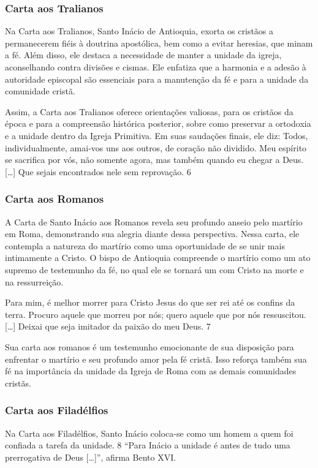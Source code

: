 \documentclass[a4paper,14pt]{extarticle} \usepackage[utf8]{inputenc}
\begin{document}
\subsubsection{Carta aos Tralianos}

Na Carta aos Tralianos, Santo Inácio de Antioquia, exorta os cristãos a permanecerem fiéis à doutrina apostólica, bem como a evitar heresias, que minam a fé. Além disso, ele destaca a necessidade de manter a unidade da igreja, aconselhando contra divisões e cismas. Ele enfatiza que a harmonia e a adesão à autoridade episcopal são essenciais para a manutenção da fé e para a unidade da comunidade cristã.

Assim, a Carta aos Tralianos oferece orientações valiosas, para os cristãos da época e para a compreensão histórica posterior, sobre como preservar a ortodoxia e a unidade dentro da Igreja Primitiva. Em suas saudações finais, ele diz: Todos, individualmente, amai-vos uns aos outros, de coração não dividido. Meu espírito se sacrifica por vós, não somente agora, mas também quando eu chegar a Deus. […] Que sejais encontrados nele sem reprovação. 6
\subsubsection{Carta aos Romanos}

A Carta de Santo Inácio aos Romanos revela seu profundo anseio pelo martírio em Roma, demonstrando sua alegria diante dessa perspectiva. Nessa carta, ele contempla a natureza do martírio como uma oportunidade de se unir mais intimamente a Cristo. O bispo de Antioquia compreende o martírio como um ato supremo de testemunho da fé, no qual ele se tornará um com Cristo na morte e na ressurreição.

Para mim, é melhor morrer para Cristo Jesus do que ser rei até os confins da terra. Procuro aquele que morreu por nós; quero aquele que por nós ressuscitou. […] Deixai que seja imitador da paixão do meu Deus. 7

Sua carta aos romanos é um testemunho emocionante de sua disposição para enfrentar o martírio e seu profundo amor pela fé cristã. Isso reforça também sua fé na importância da unidade da Igreja de Roma com as demais comunidades cristãs.
\subsubsection{Carta aos Filadélfios}

Na Carta aos Filadélfios, Santo Inácio coloca-se como um homem a quem foi confiada a tarefa da unidade. 8 “Para Inácio a unidade é antes de tudo uma prerrogativa de Deus […]”, afirma Bento XVI.
\end{document}
